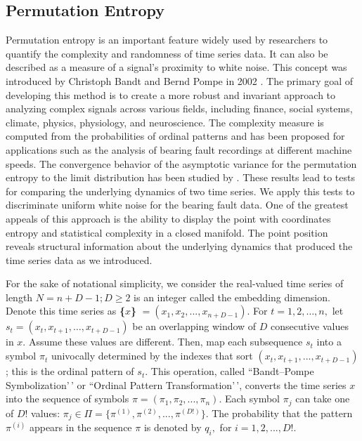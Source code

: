 \documentclass[sn-basic,pdflatex]{sn-jnl}
\theoremstyle{remark}
\theoremstyle{definition}
\begin{document}
\subsection{Permutation Entropy}\label{permutation-entropy}

Permutation entropy is an important feature widely used by researchers
to quantify the complexity and randomness of time series data. It can
also be described as a measure of a signal's proximity to white noise.
This concept was introduced by Christoph Bandt and Bernd Pompe in 2002
\citep{PhysRevLett.88.174102}. The primary goal of developing this
method is to create a more robust and invariant approach to analyzing
complex signals across various fields, including finance, social
systems, climate, physics, physiology, and neuroscience. The complexity
measure is computed from the probabilities of ordinal patterns and has
been proposed for applications such as the analysis of bearing fault
recordings at different machine speeds. The convergence behavior of the
asymptotic variance for the permutation entropy to the limit
distribution has been studied by \citep{REY2024115481}. These results
lead to tests for comparing the underlying dynamics of two time series.
We apply this tests to discriminate uniform white noise for the bearing
fault data. One of the greatest appeals of this approach is the ability
to display the point with coordinates entropy and statistical complexity
in a closed manifold. The point position reveals structural information
about the underlying dynamics that produced the time series data as we
introduced.

For the sake of notational simplicity, we consider the real-valued time
series of length \(N=n+D-1; D\ge2\) is an integer called the embedding
dimension. Denote this time series as \textbf{\{\(x\)\}}
\(= (x_1, x_2, ..., x_{n+D-1})\). For \(t=1, 2, …,n,\) let
\(s_t = (x_t,x_{t+1},…,x_{t+D-1})\) be an overlapping window of \(D\)
consecutive values in \(x\). Assume these values are different. Then,
map each subsequence \(s_t\) into a symbol \(\pi_t\) univocally
determined by the indexes that sort \((x_t, x_{t+1}, ..., x_{t+D-1})\);
this is the ordinal pattern of \(s_t\). This operation, called
``Bandt--Pompe Symbolization'\,' or ``Ordinal Pattern
Transformation'\,', converts the time series \textbf{\(x\)} into the
sequence of symbols \(\pi=(\pi_1, \pi_2, ..., \pi_n)\). Each symbol
\(\pi_j\) can take one of \(D!\) values:
\(\pi_j \in \Pi=\{\pi^{(1)}, \pi^{(2)}, ..., \pi^{(D!)}\}\). The
probability that the pattern \(\pi^{(i)}\) appears in the sequence
\textbf{\(\pi\)} is denoted by \(q_i,\) for \(i=1,2, ..., D!\).
\end{document}
